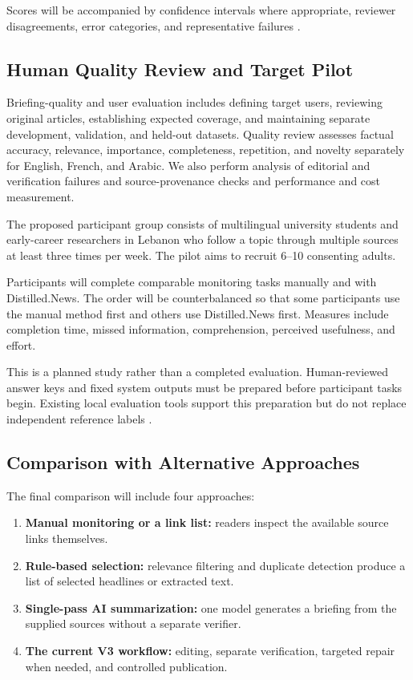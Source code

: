 Scores will be accompanied by confidence intervals where appropriate, reviewer disagreements, error categories, and representative failures \cite{performanceprotocol,validationplan}.

\subsection{Human Quality Review and Target Pilot}

Briefing-quality and user evaluation includes defining target users, reviewing original articles, establishing expected coverage, and maintaining separate development, validation, and held-out datasets. Quality review assesses factual accuracy, relevance, importance, completeness, repetition, and novelty separately for English, French, and Arabic. We also perform analysis of editorial and verification failures and source-provenance checks and performance and cost measurement.

The proposed participant group consists of multilingual university students and early-career researchers in Lebanon who follow a topic through multiple sources at least three times per week. The pilot aims to recruit 6--10 consenting adults.

Participants will complete comparable monitoring tasks manually and with Distilled.News. The order will be counterbalanced so that some participants use the manual method first and others use Distilled.News first. Measures include completion time, missed information, comprehension, perceived usefulness, and effort.

This is a planned study rather than a completed evaluation. Human-reviewed answer keys and fixed system outputs must be prepared before participant tasks begin. Existing local evaluation tools support this preparation but do not replace independent reference labels \cite{localquality}.

\subsection{Comparison with Alternative Approaches}

The final comparison will include four approaches:

\begin{enumerate}
    \item \textbf{Manual monitoring or a link list:}
    readers inspect the available source links themselves.

    \item \textbf{Rule-based selection:}
    relevance filtering and duplicate detection produce a list of selected headlines or extracted text.

    \item \textbf{Single-pass AI summarization:}
    one model generates a briefing from the supplied sources without a separate verifier.

    \item \textbf{The current V3 workflow:}
    editing, separate verification, targeted repair when needed, and controlled publication.
\end{enumerate}

